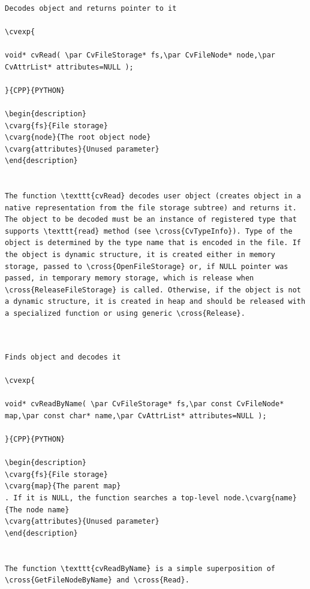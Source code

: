 \begin{verbatim}

Decodes object and returns pointer to it

\cvexp{

void* cvRead( \par CvFileStorage* fs,\par CvFileNode* node,\par CvAttrList* attributes=NULL );

}{CPP}{PYTHON}

\begin{description}
\cvarg{fs}{File storage}
\cvarg{node}{The root object node}
\cvarg{attributes}{Unused parameter}
\end{description}


The function \texttt{cvRead} decodes user object (creates object in a native representation from the file storage subtree) and returns it. The object to be decoded must be an instance of registered type that supports \texttt{read} method (see \cross{CvTypeInfo}). Type of the object is determined by the type name that is encoded in the file. If the object is dynamic structure, it is created either in memory storage, passed to \cross{OpenFileStorage} or, if NULL pointer was passed, in temporary memory storage, which is release when \cross{ReleaseFileStorage} is called. Otherwise, if the object is not a dynamic structure, it is created in heap and should be released with a specialized function or using generic \cross{Release}.


\end{verbatim}
\label{ReadByName}
\begin{verbatim}

Finds object and decodes it

\cvexp{

void* cvReadByName( \par CvFileStorage* fs,\par const CvFileNode* map,\par const char* name,\par CvAttrList* attributes=NULL );

}{CPP}{PYTHON}

\begin{description}
\cvarg{fs}{File storage}
\cvarg{map}{The parent map}
. If it is NULL, the function searches a top-level node.\cvarg{name}{The node name}
\cvarg{attributes}{Unused parameter}
\end{description}


The function \texttt{cvReadByName} is a simple superposition of \cross{GetFileNodeByName} and \cross{Read}.


\end{verbatim}
